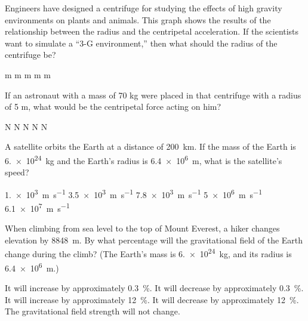 \documentclass{../../../oss-ap12ibhl}
\begin{document}
\begin{questions}
  \question Engineers have designed a centrifuge for studying the effects of
  high gravity environments on plants and animals. This graph shows the results
  of the relationship between the radius and the centripetal acceleration. If
  the scientists want to simulate a ``3-G environment,'' then what should the
  radius of the centrifuge be?
  \label{centrifugal1}
  \begin{choices}
     m
     m
     m
     m
     m
  \end{choices}
    
  \question If an astronaut with a mass of 70 kg were placed in that centrifuge
  with a radius of 5 m, what would be the centripetal force acting on him?
  \label{centrifugal2}
  \begin{choices}
     N
     N
     N
     N
     N
  \end{choices}
    
  \question A satellite orbits the Earth at a distance of
  \SI{200}{\kilo\metre}. If the mass of the Earth is \SI{6.e24}{\kilo\gram} and
  the Earth's radius is \SI{6.4e6}{\metre}, what is the satellite's speed?
  \begin{choices}
    \choice\SI{1.e3}{\metre\per\second}
    \choice\SI{3.5e3}{\metre\per\second}
    \choice\SI{7.8e3}{\metre\per\second}
    \choice\SI{5e6}{\metre\per\second}
    \choice\SI{6.1e7}{\metre\per\second}
  \end{choices}
    
  \question When climbing from sea level to the top of Mount Everest, a hiker
  changes elevation by \SI{8848}{\metre}. By what percentage will the
  gravitational field of the Earth change during the climb? (The Earth's mass
  is \SI{6.e24}{\kilo\gram}, and its radius is \SI{6.4e6}{\metre}.)
  \begin{choices}
    \choice It will increase by approximately \SI{.3}{\percent}.
    \choice It will decrease by approximately \SI{.3}{\percent}.
    \choice It will increase by approximately \SI{12}{\percent}.
    \choice It will decrease by approximately \SI{12}{\percent}.
    \choice The gravitational field strength will not change.
  \end{choices}


\end{questions}
\end{document}
